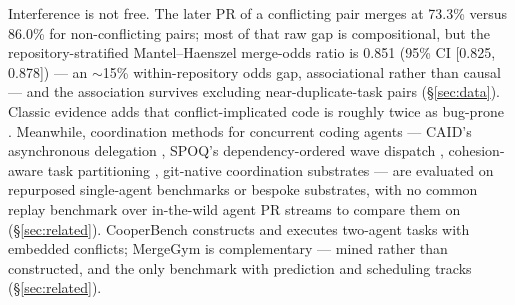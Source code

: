 \documentclass{article}
\begin{document}
Interference is not free. The later PR of a conflicting pair merges at 73.3\% versus 86.0\% for non-conflicting pairs; most of that raw gap is compositional, but the repository-stratified Mantel--Haenszel merge-odds ratio is 0.851 (95\% CI [0.825, 0.878]) --- an $\sim$15\% within-repository odds gap, associational rather than causal --- and the association survives excluding near-duplicate-task pairs (\S\ref{sec:data}). %
Classic evidence adds that conflict-implicated code is roughly twice as bug-prone \citep{brindescu2020emse}. %
Meanwhile, coordination methods for concurrent coding agents --- CAID's asynchronous delegation \citep{geng2026caid}, SPOQ's dependency-ordered wave dispatch \citep{spoq2026}, cohesion-aware task partitioning \citep{cohesion2026}, git-native coordination substrates \citep{sarkar2026grite} --- are evaluated on repurposed single-agent benchmarks or bespoke substrates, with no common replay benchmark over in-the-wild agent PR streams to compare them on (\S\ref{sec:related}). CooperBench \citep{khatua2026cooperbench} constructs and executes two-agent tasks with embedded conflicts; MergeGym is complementary --- mined rather than constructed, and the only benchmark with prediction and scheduling tracks (\S\ref{sec:related}).
\end{document}
